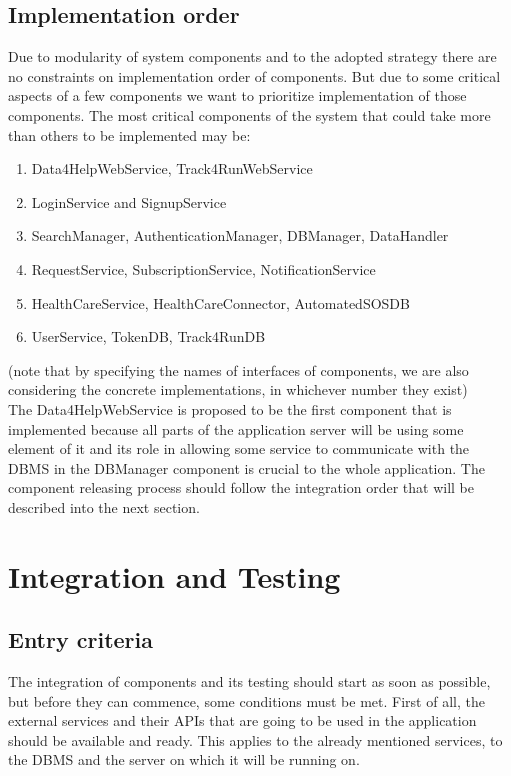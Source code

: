 \documentclass[a4paper, hidelinks, 12pt]{report}
\begin{document}
\subsection{Implementation order}
Due to modularity of system components and to the adopted strategy there are no constraints on implementation order of components. But due to some critical aspects of a few components we want to prioritize implementation of those components.
The most critical components of the system that could take more than others to be implemented may be:

\begin{enumerate}
\item{} Data4HelpWebService, Track4RunWebService
\item{} LoginService and SignupService
\item{} SearchManager, AuthenticationManager, DBManager, DataHandler
\item{} RequestService, SubscriptionService, NotificationService
\item{} HealthCareService, HealthCareConnector, AutomatedSOSDB
\item{} UserService, TokenDB, Track4RunDB
\end{enumerate}
(note that by specifying the names of interfaces of components, we are also considering the concrete implementations, in whichever number they exist)\\

The Data4HelpWebService is proposed to be the first component that is implemented because all parts of the application server will be using some element of it and its role in allowing some service to communicate with the DBMS in the DBManager component is crucial to the whole application. The component releasing process should follow the integration order that will be described into the next section.

\section{Integration and Testing}
\subsection{Entry criteria} 
The integration of components and its testing should start as soon as possible, but before they can commence, some conditions must be met. First of all, the external services and their APIs that are going to be used in the application should be available and ready. This applies to the already mentioned services, to the DBMS and the server on which it will be running on. \\
\end{document}
